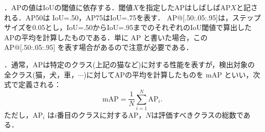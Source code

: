 \documentclass[originalpaper,fleqn]{jsaiart}     %
\begin{document}
．APの値はIoUの閾値に依存する．閾値$X$を指定したAPはしばしばAP$X$と記される．AP50は IoU=.50，AP75はIoU=.75を表す．
AP@[.50:.05:.95]は，ステップサイズを0.05とし，IoU=.50からIoU=.95までのそれぞれのIoU閾値で算出したAPの平均を計算したものである．単に AP と書いた場合，この AP@[.50:.05:.95] を表す場合があるので注意が必要である．

．通常，APは特定のクラス(上記の猫など)に対する性能を表すが，検出対象の全クラス(猫，犬，車，$\cdots$)に対してAPの平均を計算したものを mAP といい，次式で定義される：
$$ \mbox{mAP} = \frac{1}{N} \sum^N_{i{=}1} \mbox{AP}_i. $$
ただし，AP$_i$ は$i$番目のクラスに対するAP，$N$は評価すべきクラスの総数である．


\begin{biography}
\end{biography}
\end{document}
